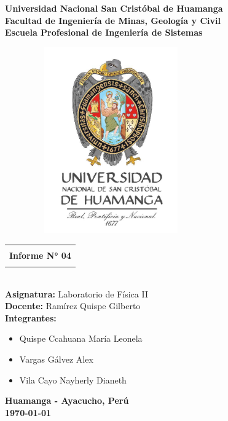 \begin{titlepage}
	\begin{center}
		{\LARGE\textbf{Universidad Nacional San Cristóbal de Huamanga}}\\
		\vspace{0.5cm}
		{\LARGE\textbf{Facultad de Ingeniería de Minas, Geología y Civil}}\\
		\vspace{0.5cm}
		{\LARGE\textbf{Escuela Profesional de Ingeniería de Sistemas}}\\
		\vspace{1cm}
		\begin{figure}[h]
			\centering
			\includegraphics[width=7cm, height=8cm]{imagenes/logo.jpg}
		\end{figure}
		\vspace{0.5cm}
		\begin{tabular}{|c|}
			\hline
			\\
			{\Large\textbf{ Informe N° 04  }}\\
			\\
			\hline
		\end{tabular}\\
		\vspace{0.5cm}
		{\Large\textbf{Asignatura: } Laboratorio de Física II}\\
		\vspace{0.2cm}
		{\Large\textbf{Docente: } Ramírez Quispe Gilberto}\\
		\vspace{0.2cm}
		{\Large\textbf{Integrantes: }}
		
		\begin{itemize}
			\centering		
			\item {\Large Quispe Ccahuana María Leonela}
			\item {\Large Vargas Gálvez Alex} 
			\item {\Large Vila Cayo Nayherly Dianeth}
		\end{itemize}
		\vspace{2 cm}
		{\huge \textbf{Huamanga - Ayacucho, Perú}}\\
		\vspace{0.5cm}
		{\huge \textbf{\today}}
	\end{center}
\end{titlepage}
